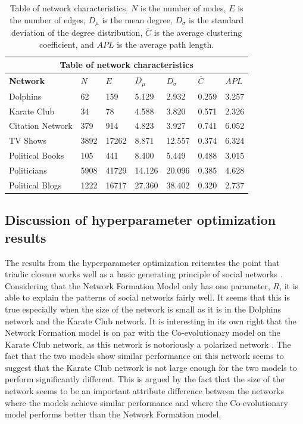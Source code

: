 \documentclass{article}
\begin{document}
\begin{table}[H]
    \begin{center}
        
    \begin{tabular}{ |p{3cm}||p{1.5cm}|p{1.5cm}|p{1.5cm}|p{1.5cm}|p{1.5cm}|p{1.5cm}|}
        \hline
        \multicolumn{7}{|c|}{Table of network characteristics} \\
        \hline
        \bf{Network} & $N$ & $E$ & $D_{\mu}$ & $D_{\sigma}$ & $\overline{C}$ & $APL$\\
        \hline
        Dolphins   & 62    &159&   5.129&   2.932 &   0.259 & 3.257\\
        Karate Club &34	&78	&4.588&	3.820&	0.571&	2.326\\
        Citation Network & 379 &	914	& 4.823	& 3.927 & 0.741 & 6.052 \\
        TV Shows & 3892 & 17262&8.871 & 12.557 & 0.374&6.324\\
        Political Books &105 &	441	& 8.400 &	5.449 &	0.488 &	3.015\\
        Politicians&  5908 &41729 & 14.126 & 20.096 &	0.385 & 4.628\\
        Political Blogs &	1222 & 16717 & 27.360 & 38.402 & 0.320 & 2.737\\
        \hline
    \end{tabular}
    \end{center}
    \caption{Table of network characteristics. $N$ is the number of nodes, $E$ is the number of edges, $D_{\mu}$ is the mean degree, $D_{\sigma}$ is the standard deviation of the degree distribution, $\overline{C}$ is the average clustering coefficient, and $APL$ is the average path length. }
    \label{table:characteristics}
    \end{table}

\subsection{Discussion of hyperparameter optimization results}
The results from the hyperparameter optimization reiterates the point that triadic closure works well as a basic generating principle of social networks \cite{jackson_meeting_2007,kossinets_origins_2009,bianconi_triadic_2014}. 
Considering that the Network Formation Model only has one parameter, $R$, it is able to explain the patterns of social networks fairly well. 
It seems that this is true especially when the size of the network is small as it is in the Dolphins network and the Karate Club network. 
It is interesting in its own right that the Network Formation model is on par with the Co-evolutionary model on the Karate Club network, as this network is notoriously a polarized network \cite{zachary_information_1977}. 
The fact that the two models show similar performance on this network seems to suggest that the Karate Club network is not large enough for the two models to perform significantly different. 
This is argued by the fact that the size of the network seems to be an important attribute difference between the networks where the models achieve similar performance and where the Co-evolutionary model performs better than the Network Formation model. 
\end{document}
